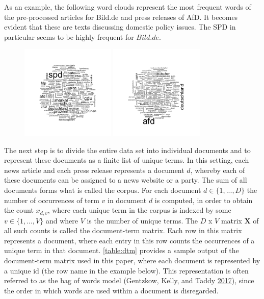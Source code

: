 \documentclass[
]{article}
\begin{document}
As an example, the following word clouds represent the most frequent
words of the pre-processed articles for Bild.de and press releases of
AfD. It becomes evident that these are texts discussing domestic policy
issues. The SPD in particular seems to be highly frequent for
\(Bild.de\).

\begin{figure}\centering

\includegraphics[width=0.4\textwidth,height=\textheight]{../figs/wordcloud_bild.png}
\includegraphics[width=0.4\textwidth,height=\textheight]{../figs/wordcloud_afd.png}

\end{figure}

The next step is to divide the entire data set into individual documents
and to represent these documents as a finite list of unique terms. In
this setting, each news article and each press release represents a
document \(d\), whereby each of these documents can be assigned to a
news website or a party. The sum of all documents forms what is called
the corpus. For each document \(d \in \lbrace 1,...,D \rbrace\) the
number of occurrences of term \(v\) in document \(d\) is computed, in
order to obtain the count \(x_{d,v}\), where each unique term in the
corpus is indexed by some \(v \in \lbrace 1,...,V \rbrace\) and where
\(V\) is the number of unique terms. The \(D\) x \(V\) matrix
\(\boldsymbol{X}\) of all such counts is called the document-term
matrix. Each row in this matrix represents a document, where each entry
in this row counts the occurrences of a unique term in that document.
\autoref{table:dtm} provides a sample output of the document-term matrix
used in this paper, where each document is represented by a unique id
(the row name in the example below). This representation is often
referred to as the bag of words model (Gentzkow, Kelly, and Taddy
\protect\hyperlink{ref-gentzkow_text_2017}{2017}), since the order in
which words are used within a document is disregarded.
\end{document}
